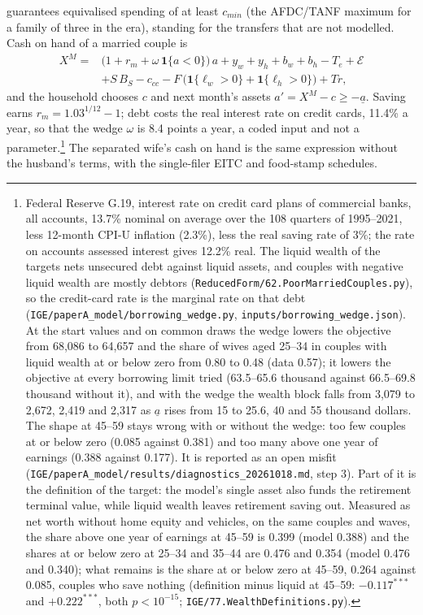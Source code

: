 guarantees equivalised spending of at least $c_{min}$ (the AFDC/TANF maximum for a family of three in the era),
standing for the transfers that are not modelled. Cash on hand of a married couple is
\begin{equation}\label{eq:budget}
  \begin{aligned}
  X^M = {} & \big(1 + r_m + \omega\,\mathbf{1}\{a < 0\}\big)\,a + y_w + y_h + b_w + b_h - T_e + \mathcal E \\
           & + S\, B_S - c_{cc} - F\,\big(\mathbf{1}\{\ell_w > 0\} + \mathbf{1}\{\ell_h > 0\}\big) + Tr,
  \end{aligned}
\end{equation}
and the household chooses $c$ and next month's assets $a' = X^M - c \ge -\underline{a}$. Saving earns
$r_m = 1.03^{1/12} - 1$; debt costs the real interest rate on credit cards, 11.4\% a year, so that the wedge $\omega$ is
8.4 points a year, a coded input and not a parameter.\footnote{Federal Reserve G.19, interest rate on credit card plans
of commercial banks, all accounts, 13.7\% nominal on average over the 108 quarters of 1995--2021, less 12-month CPI-U
inflation (2.3\%), less the real saving rate of 3\%; the rate on accounts assessed interest gives 12.2\% real. The
liquid wealth of the targets nets unsecured debt against liquid assets, and couples with negative liquid wealth are
mostly debtors (\texttt{ReducedForm/62.PoorMarriedCouples.py}), so the credit-card rate is the marginal rate on that
debt (\texttt{IGE/paperA\_model/borrowing\_wedge.py}, \texttt{inputs/borrowing\_wedge.json}). At the start values and
on common draws the wedge lowers the objective from 68{,}086 to 64{,}657 and the share of wives aged 25--34 in couples
with liquid wealth at or below zero from 0.80 to 0.48 (data 0.57); it lowers the objective at every borrowing limit
tried (63.5--65.6 thousand against 66.5--69.8 thousand without it), and with the wedge the wealth block falls from 3{,}079
to 2{,}672, 2{,}419 and 2{,}317 as $\underline a$ rises from 15 to 25.6, 40 and 55 thousand dollars. The shape at 45--59
stays wrong with or without the wedge: too few couples at or below zero (0.085 against 0.381) and too many above one
year of earnings (0.388 against 0.177). It is reported as an open misfit
(\texttt{IGE/paperA\_model/results/diagnostics\_20261018.md}, step 3). Part of it is the definition of the target: the
model's single asset also funds the retirement terminal value, while liquid wealth leaves retirement saving out.
Measured as net worth without home equity and vehicles, on the same couples and waves, the share above one year of
earnings at 45--59 is 0.399 (model 0.388) and the shares at or below zero at 25--34 and 35--44 are 0.476 and 0.354
(model 0.476 and 0.340); what remains is the share at or below zero at 45--59, 0.264 against 0.085, couples who save
nothing (definition minus liquid at 45--59: $-0.117^{***}$ and $+0.222^{***}$, both $p<10^{-15}$;
\texttt{IGE/77.WealthDefinitions.py}).} The separated wife's cash on hand is the same
expression without the husband's terms, with the single-filer EITC and food-stamp schedules.

